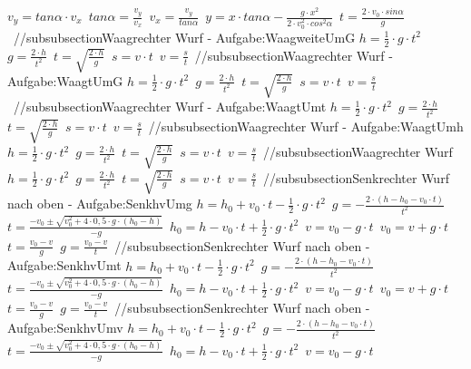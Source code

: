 $ v_{y} = tan \alpha \cdot  v_{x} $\ 
$ tan \alpha = \frac{v_{y} }{v_{x} } $\ 
$ v_{x} = \frac{v_{y} }{tan \alpha } $\ 
$ y = x\cdot tan \alpha  - \frac{   g\cdot x^{2} }{2\cdot v^{2} _{0} \cdot cos ^{2}\alpha } $\ 
$ t =\frac{2\cdot v_{0} \cdot sin \alpha }{ g} $\ 
//subsubsection{Waagrechter Wurf - Aufgabe:WaagweiteUmG} 
$ h = \frac{1}{2}\cdot g\cdot t^{2} $\ 
$ g = \frac{2\cdot h}{t^{2} } $\ 
$ t = \sqrt{\frac{2\cdot h}{g}} $\ 
$ s = v\cdot t $\ 
$ v = \frac{s}{t} $\ 
//subsubsection{Waagrechter Wurf - Aufgabe:WaagtUmG} 
$ h = \frac{1}{2}\cdot g\cdot t^{2} $\ 
$ g = \frac{2\cdot h}{t^{2} } $\ 
$ t = \sqrt{\frac{2\cdot h}{g}} $\ 
$ s = v\cdot t $\ 
$ v = \frac{s}{t} $\ 
//subsubsection{Waagrechter Wurf - Aufgabe:WaagtUmt} 
$ h = \frac{1}{2}\cdot g\cdot t^{2} $\ 
$ g = \frac{2\cdot h}{t^{2} } $\ 
$ t = \sqrt{\frac{2\cdot h}{g}} $\ 
$ s = v\cdot t $\ 
$ v = \frac{s}{t} $\ 
//subsubsection{Waagrechter Wurf - Aufgabe:WaagtUmh} 
$ h = \frac{1}{2}\cdot g\cdot t^{2} $\ 
$ g = \frac{2\cdot h}{t^{2} } $\ 
$ t = \sqrt{\frac{2\cdot h}{g}} $\ 
$ s = v\cdot t $\ 
$ v = \frac{s}{t} $\ 
//subsubsection{Waagrechter Wurf} 
$ h = \frac{1}{2}\cdot g\cdot t^{2} $\ 
$ g = \frac{2\cdot h}{t^{2} } $\ 
$ t = \sqrt{\frac{2\cdot h}{g}} $\ 
$ s = v\cdot t $\ 
$ v = \frac{s}{t} $\ 
//subsubsection{Senkrechter Wurf nach oben  - Aufgabe:SenkhvUmg} 
$ h = h_{0}  + v_{0} \cdot t - \frac{1}{2}\cdot g\cdot t^{2} $\ 
$ g = - \frac{2\cdot (h - h_{0}  - v_{0} \cdot t)}{     t^{2} } $\ 
$ t = \frac{-v_{0}  \pm \sqrt{v_{0} ^{2} +4\cdot 0,5\cdot g\cdot (h_{0}  -h)}}{      -g} $\ 
$ h_{0}  = h - v_{0} \cdot t + \frac{1}{2}\cdot g\cdot t^{2} $\ 
$ v = v_{0}  - g\cdot t $\ 
$ v_{0}  = v + g\cdot t $\ 
$ t = \frac{v_{0} -v}{  g} $\ 
$ g = \frac{v_{0}  - v}{  t} $\ 
//subsubsection{Senkrechter Wurf nach oben  - Aufgabe:SenkhvUmt} 
$ h = h_{0}  + v_{0} \cdot t - \frac{1}{2}\cdot g\cdot t^{2} $\ 
$ g = - \frac{2\cdot (h - h_{0}  - v_{0} \cdot t)}{     t^{2} } $\ 
$ t = \frac{-v_{0}  \pm \sqrt{v_{0} ^{2} +4\cdot 0,5\cdot g\cdot (h_{0}  -h)}}{      -g} $\ 
$ h_{0}  = h - v_{0} \cdot t + \frac{1}{2}\cdot g\cdot t^{2} $\ 
$ v = v_{0}  - g\cdot t $\ 
$ v_{0}  = v + g\cdot t $\ 
$ t = \frac{v_{0} -v}{  g} $\ 
$ g = \frac{v_{0}  - v}{  t} $\ 
//subsubsection{Senkrechter Wurf nach oben  - Aufgabe:SenkhvUmv} 
$ h = h_{0}  + v_{0} \cdot t - \frac{1}{2}\cdot g\cdot t^{2} $\ 
$ g = - \frac{2\cdot (h - h_{0}  - v_{0} \cdot t)}{     t^{2} } $\ 
$ t = \frac{-v_{0}  \pm \sqrt{v_{0} ^{2} +4\cdot 0,5\cdot g\cdot (h_{0}  -h)}}{      -g} $\ 
$ h_{0}  = h - v_{0} \cdot t + \frac{1}{2}\cdot g\cdot t^{2} $\ 
$ v = v_{0}  - g\cdot t $\ 
